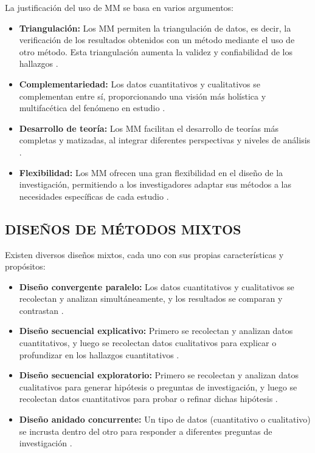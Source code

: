 La justificación del uso de MM se basa en varios argumentos:

\begin{itemize}
    \item \textbf{Triangulación:} Los MM permiten la triangulación de datos, es decir, la verificación de los resultados obtenidos con un método mediante el uso de otro método. Esta triangulación aumenta la validez y confiabilidad de los hallazgos \autocite{Jick1979}.
    \item \textbf{Complementariedad:} Los datos cuantitativos y cualitativos se complementan entre sí, proporcionando una visión más holística y multifacética del fenómeno en estudio \autocite{Greene2007}.
    \item \textbf{Desarrollo de teoría:} Los MM facilitan el desarrollo de teorías más completas y matizadas, al integrar diferentes perspectivas y niveles de análisis \autocite{Morse1991}.
    \item \textbf{Flexibilidad:} Los MM ofrecen una gran flexibilidad en el diseño de la investigación, permitiendo a los investigadores adaptar sus métodos a las necesidades específicas de cada estudio \autocite{Johnson2017}.
\end{itemize}

\subsection{DISEÑOS DE MÉTODOS MIXTOS}

Existen diversos diseños mixtos, cada uno con sus propias características y propósitos:

\begin{itemize}
    \item \textbf{Diseño convergente paralelo:} Los datos cuantitativos y cualitativos se recolectan y analizan simultáneamente, y los resultados se comparan y contrastan \autocite{Creswell2018}.
    \item \textbf{Diseño secuencial explicativo:} Primero se recolectan y analizan datos cuantitativos, y luego se recolectan datos cualitativos para explicar o profundizar en los hallazgos cuantitativos \autocite{Creswell2018}.
    \item \textbf{Diseño secuencial exploratorio:} Primero se recolectan y analizan datos cualitativos para generar hipótesis o preguntas de investigación, y luego se recolectan datos cuantitativos para probar o refinar dichas hipótesis \autocite{Creswell2018}.
    \item \textbf{Diseño anidado concurrente:} Un tipo de datos (cuantitativo o cualitativo) se incrusta dentro del otro para responder a diferentes preguntas de investigación \autocite{Creswell2018}.
\end{itemize}

